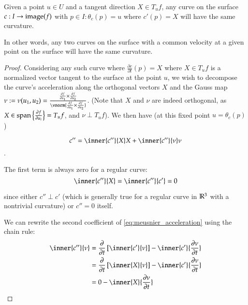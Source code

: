 	\begin{theorem} \label{thm:meusnier}
		Given a point $u \in U $ and a tangent direction $X \in T_u f$,
  any curve on the surface $c: I \to \mathrm{image}(f)$ with $p\in I : \theta_c(p) = u$
  where $c'(p) = X$ will have the same curvature.
	\end{theorem}
	
	
	In other words, any two curves on the surface with a common velocity at a given point on the surface will have the same curvature.
	\begin{proof}
	Considering any such curve where $\frac{\partial c}{\partial t}(p) = X$ where $X \in T_u f$ is a normalized vector tangent to the surface at the point $u$,
	we wish to decompose the curve's acceleration along the  orthogonal vectors $X$ and
	the Gauss map $\nu := \nu(u_1, u_2) =
		\frac{\frac{\partial f}{\partial u_1} \times \frac{\partial f}{\partial u_2}}
		{\vnorm{\frac{\partial f}{\partial u_1} \times \frac{\partial f}{\partial u_2}}}$.
		(Note that $X$ and $\nu$ are indeed orthogonal,
		as $ X \in \mathrm{span}\left\{\frac{\partial f}{\partial u_i}\right\} = T_u f$, and
		$\nu \perp T_u f$).
	 We then have (at this fixed point $u=\theta_c(p)$)
		
		\begin{equation} \label{eq:meusnier_acceleration}
			c'' = \inner{c''}{X} X + \inner{c''}{\nu}\nu
			\end{equation}. 
	
	The first term is always zero for a regular curve:
	\[ \inner{c''}{X} = \inner{c''}{c'} = 0 \]
	
	since either $c'' \perp c'$ (which is generally true for a regular curve in $\mathbb{R}^3$ with a nontrivial curvature) or $c'' = 0$ itself.  
	
	We can rewrite the second coefficient of \cref{eq:meusnier_acceleration} using the chain rule: %
	\begin{align}
		\inner{c''}{\nu} &=
		\frac{\partial}{\partial t}\left[ \inner{c'}{\nu} \right]
			- \inner{c'}{\frac{\partial \nu}{\partial t}} \\
			&= \frac{\partial}{\partial t}\left[ \inner{X}{\nu} \right]
			- \inner{c'}{\frac{\partial \nu}{\partial t}} \\
			&= 0 - \inner{X}{\frac{\partial \nu}{\partial t}}
			\end{align}
	

\end{proof}
